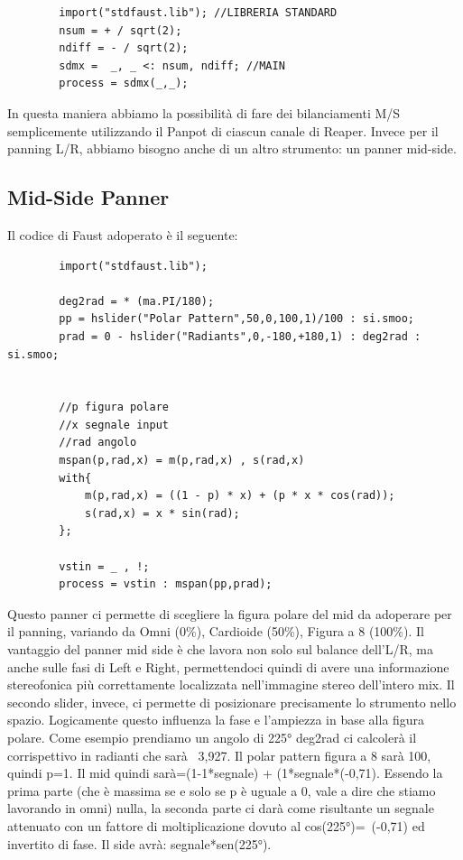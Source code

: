 \documentclass{article}
\begin{document}
    \begin{lstlisting}
        import("stdfaust.lib"); //LIBRERIA STANDARD
        nsum = + / sqrt(2);
        ndiff = - / sqrt(2);
        sdmx =  _, _ <: nsum, ndiff; //MAIN
        process = sdmx(_,_);
    \end{lstlisting}

    In questa maniera abbiamo la possibilità di fare dei bilanciamenti M/S semplicemente utilizzando il Panpot di ciascun canale di Reaper.
    Invece per il panning L/R, abbiamo bisogno anche di un altro strumento: un panner mid-side.
    
    \subsection{Mid-Side Panner}
    
    Il codice di Faust adoperato è il seguente:

    \begin{lstlisting}
        import("stdfaust.lib"); 
        
        deg2rad = * (ma.PI/180);
        pp = hslider("Polar Pattern",50,0,100,1)/100 : si.smoo;
        prad = 0 - hslider("Radiants",0,-180,+180,1) : deg2rad : si.smoo;
        
        
        //p figura polare
        //x segnale input
        //rad angolo
        mspan(p,rad,x) = m(p,rad,x) , s(rad,x)
        with{
            m(p,rad,x) = ((1 - p) * x) + (p * x * cos(rad));
            s(rad,x) = x * sin(rad);
        };
        
        vstin = _ , !;
        process = vstin : mspan(pp,prad);
    \end{lstlisting}

    Questo panner ci permette di scegliere la figura polare del mid da adoperare per il panning, variando da Omni (0\%), Cardioide (50\%), Figura a 8 (100\%). Il vantaggio del panner mid side è che lavora non solo sul balance dell'L/R, ma anche sulle fasi di Left e Right, permettendoci quindi di avere una informazione stereofonica più correttamente localizzata nell'immagine stereo dell'intero mix.
    Il secondo slider, invece, ci permette di posizionare precisamente lo strumento nello spazio. Logicamente questo influenza la fase e l'ampiezza in base alla figura polare.
    Come esempio prendiamo un angolo di 225°
    deg2rad ci calcolerà il corrispettivo in radianti che sarà ~3,927.
    Il polar pattern figura a 8 sarà 100, quindi p=1.
    Il mid quindi sarà=(1-1*segnale) + (1*segnale*(-0,71). Essendo la prima parte (che è massima se e solo se p è uguale a 0, vale a dire che stiamo lavorando in omni) nulla, la seconda parte ci darà come risultante un segnale attenuato con un fattore di moltiplicazione dovuto al cos(225°)=~(-0,71) ed invertito di fase.
    Il side avrà: segnale*sen(225°).
\end{document}
